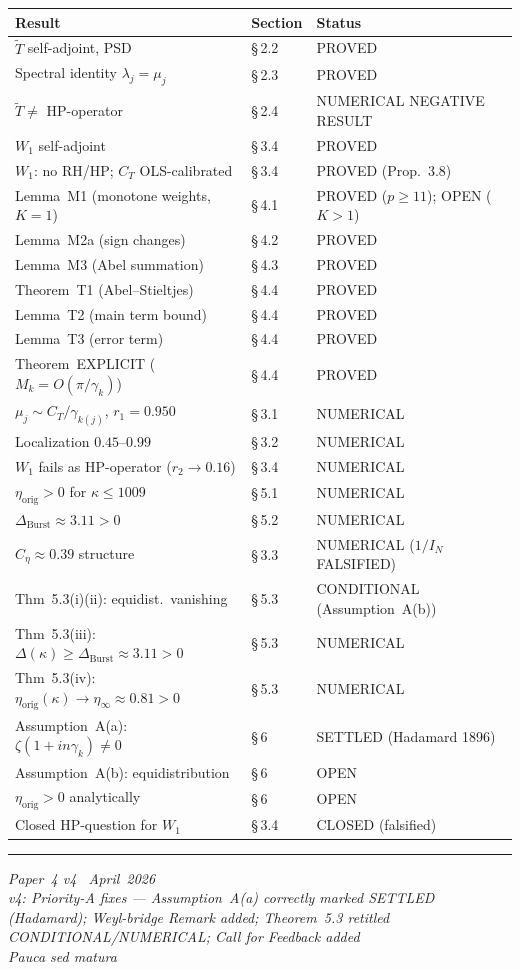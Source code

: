 \documentclass[11pt]{article}
\newcommand{\etaorig}{\eta_{\mathrm{orig}}}
\newcommand{\Tt}{\widetilde{T}}
\newcommand{\Ceta}{C_{\eta}}
\newcommand{\CT}{C_{T}}
\newcommand{\Wone}{W_1}
\newcommand{\Dburstvar}{\Delta_{\mathrm{Burst}}}
\begin{document}
\begin{center}
\renewcommand{\arraystretch}{1.2}
\begin{tabular}{lll}
\toprule
Result & Section & Status \\
\midrule
$\Tt$ self-adjoint, PSD & \S\,2.2 & PROVED \\
Spectral identity $\lambda_j=\mu_j$ & \S\,2.3 & PROVED \\
$\Tt\neq$ HP-operator & \S\,2.4 & NUMERICAL NEGATIVE RESULT \\
$\Wone$ self-adjoint & \S\,3.4 & PROVED \\
$\Wone$: no RH/HP; $\CT$ OLS-calibrated & \S\,3.4 & PROVED (Prop.~3.8) \\
Lemma~M1 (monotone weights, $K=1$) & \S\,4.1 & PROVED ($p\geq 11$); OPEN ($K>1$) \\
Lemma~M2a (sign changes) & \S\,4.2 & PROVED \\
Lemma~M3 (Abel summation) & \S\,4.3 & PROVED \\
Theorem~T1 (Abel--Stieltjes) & \S\,4.4 & PROVED \\
Lemma~T2 (main term bound) & \S\,4.4 & PROVED \\
Lemma~T3 (error term) & \S\,4.4 & PROVED \\
Theorem~EXPLICIT ($M_k=O(\pi/\gamma_k)$) & \S\,4.4 & PROVED \\
$\mu_j\sim\CT/\gamma_{k(j)}$, $r_1=0.950$ & \S\,3.1 & NUMERICAL \\
Localization $0.45$--$0.99$ & \S\,3.2 & NUMERICAL \\
$\Wone$ fails as HP-operator ($r_2\to 0.16$) & \S\,3.4 & NUMERICAL \\
$\etaorig > 0$ for $\kappa\leq 1009$ & \S\,5.1 & NUMERICAL \\
$\Dburstvar\approx 3.11 > 0$ & \S\,5.2 & NUMERICAL \\
$\Ceta\approx 0.39$ structure & \S\,3.3 & NUMERICAL ($1/I_N$ FALSIFIED) \\
Thm~5.3(i)(ii): equidist.\ vanishing & \S\,5.3 & CONDITIONAL (Assumption~A(b)) \\
Thm~5.3(iii): $\Delta(\kappa)\geq\Dburstvar\approx 3.11 > 0$
  & \S\,5.3 & NUMERICAL \\
Thm~5.3(iv): $\etaorig(\kappa)\to\eta_\infty\approx 0.81 > 0$
  & \S\,5.3 & NUMERICAL \\
Assumption~A(a): $\zeta(1+in\gamma_k)\neq 0$ & \S\,6 & SETTLED (Hadamard 1896) \\
Assumption~A(b): equidistribution & \S\,6 & OPEN \\
$\etaorig > 0$ analytically & \S\,6 & OPEN \\
Closed HP-question for $\Wone$ & \S\,3.4 & CLOSED (falsified) \\
\bottomrule
\end{tabular}
\end{center}

\bigskip
\hrule
\smallskip
\noindent\small
\emph{Paper~4 v4 \textperiodcentered\ April~2026}\\
\emph{v4: Priority-A fixes --- Assumption~A(a) correctly marked SETTLED (Hadamard);
Weyl-bridge Remark added; Theorem~5.3 retitled CONDITIONAL/NUMERICAL;
Call for Feedback added}\\
\emph{Pauca sed matura}
\end{document}
